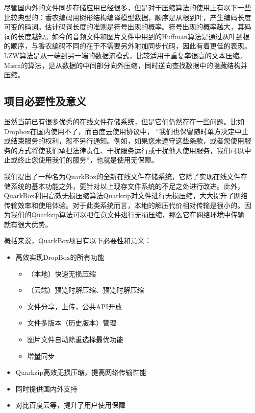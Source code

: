 \documentclass[UTF8]{ctexart}
\begin{document}
尽管国内外的文件同步存储应用已经很多，但是对于压缩算法的使用上有以下一些比较典型的：香农编码用树形结构编译模型数据，顺序是从根到叶，产生编码长度可变的码词。估计码词长度的准则是符号出现的概率。符号出现的概率越大，其码词的长度越短。如今的音频文件和图片文件中用到的Huffman算法是通过从叶到根的顺序，与香农编码不同的在于不需要另外附加同步代码，因此有着更佳的表现。LZW算法是从一端到另一端的数据流模式，比较适用于重复率很高的文本压缩。Misra的算法，是从数据的中间部分向外压缩，同时逆向查找数据中的隐藏结构并压缩。

\subsection{项目必要性及意义}
虽然当前已有很多优秀的在线文件存储系统，但是它们仍然存在一些问题。比如Dropbox在国内使用不了，而百度云使用协议中， “我们也保留随时单方决定中止或结束服务的权利，恕不另行通知。例如，如果您未遵守这些条款，或者您使用服务的方式将使我们承担法律责任、干扰服务运行或干扰他人使用服务，我们可以中止或终止您使用我们的服务”，也就是使用无保障。

我们提出了一种名为QuarkBox的全新在线文件存储系统，它除了实现在线文件存储系统的基本功能之外，更针对以上现存文件系统的不足之处进行改进。此外，QuarkBox利用高效无损压缩算法Quarkzip对文件进行无损压缩，大大提升了网络传输效率和使用体验。对于此类系统而言，本地的解压代价相对传输是很小的。因为我们的Quarkzip算法可以把任意文件进行无损压缩，那么它在网络环境中传输就有很大优势。

概括来说，QuarkBox项目有以下必要性和意义：

\begin{itemize}
\item 高效实现DropBox的所有功能
  \begin{itemize}
  \item （本地）快速无损压缩
  \item （云端）预览时解压缩、预览时解压缩
  \item 文件分享，上传，公共API开放
  \item 文件多版本（历史版本）管理
  \item 图片文件自动除重选择最优功能
  \item 增量同步
  \end{itemize}
\item Quarkzip高效无损压缩，提高网络传输性能
\item 同时提供国内外支持
\item 对比百度云等，提升了用户使用保障
\end{itemize}
\end{document}
